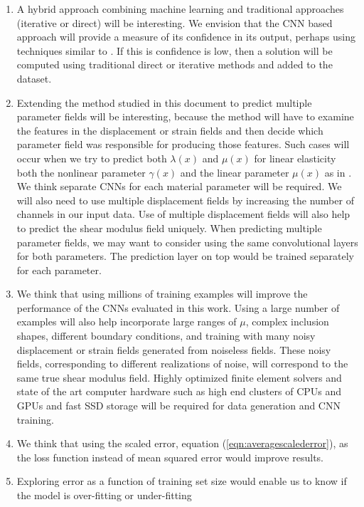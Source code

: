 \documentclass[12pt]{article}
\begin{document}
\begin{enumerate}
\item{A hybrid approach combining machine learning and traditional approaches (iterative or direct) will be interesting. We envision that the CNN based approach will provide a measure of its confidence in its output, perhaps using techniques similar to \cite{paper:patel2021}. If this is confidence is low, then a solution will be computed using traditional direct or iterative methods and added to the dataset.}
\item{Extending the method studied in this document to predict multiple parameter fields will be interesting, because the method will have to examine the features in the displacement or strain fields and then decide which parameter field was responsible for producing those features. Such cases will occur when we try to predict both $\lambda(x)$ and $\mu(x)$ for linear elasticity both the nonlinear parameter $\gamma(x)$ and the linear parameter $\mu(x)$ as in \cite{paper:gokhale2008}. We think separate CNNs for each material parameter will be required. We will also need to use multiple displacement fields \cite{paper:barbonegokhale,paper:barbonebamber} by increasing the number of channels in our input data. Use of multiple displacement fields will also help to predict the shear modulus field uniquely. When predicting multiple parameter fields, we may want to consider using the same convolutional layers for both parameters. The prediction layer on top would be trained separately for each parameter.}
\item{We think that using millions of training examples will improve the performance of the CNNs evaluated in this work. Using a large number of examples will also help incorporate large ranges of $\mu$, complex inclusion shapes, different boundary conditions, and training with many noisy displacement or strain fields generated from noiseless fields. These noisy fields, corresponding to different realizations of noise, will correspond to the same true shear modulus field. Highly optimized finite element solvers and state of the art computer hardware such as high end clusters of CPUs and GPUs and fast SSD storage will be required for data generation and CNN training.}
\item{We think that using the scaled error, equation (\ref{eqn:averagescalederror}), as the loss function instead of mean squared error would improve results.}
\item{Exploring error as a function of training set size would enable us to know if the model is over-fitting or under-fitting}  
\end{enumerate}
\end{document}
